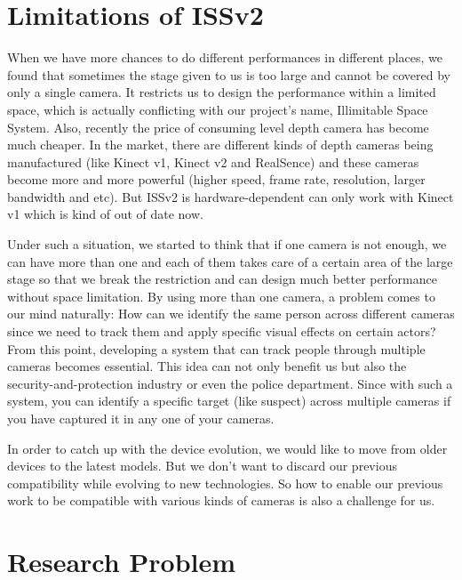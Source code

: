 \section{Limitations of ISSv2}
\label{sec:intro-lim-issv2}

When we have more chances to do different performances in different places,
we found that sometimes the stage given to us is too large and cannot be covered
by only a single camera. It restricts us to design the performance within a
limited space, which is actually conflicting with our project's name, Illimitable Space
System.
Also, recently the price of consuming level depth camera has become
much cheaper. In the market, there are different kinds of depth cameras
being manufactured (like Kinect v1, Kinect v2 and RealSence) and these cameras
become more and more powerful (higher speed, frame rate, resolution, larger
bandwidth and etc). But ISSv2 is hardware-dependent can only work with Kinect
v1 which is kind of out of date now.

Under such a situation, we started to think that if one camera is
not enough, we can have more than one and each of them takes care of a certain
area of the large stage so that we break the restriction and can design much
better performance without space limitation.
By using more than one camera, a problem comes to our mind naturally: How can
we identify the same person across different cameras since we need to track them
and apply specific visual effects on certain actors?
From this point, developing a system that can track people through multiple
cameras becomes essential.
This idea can not only benefit us but also the security-and-protection industry
or even the police department. Since with such a system, you can identify a
specific target (like suspect) across multiple cameras if you have captured it
in any one of your cameras.

In order to catch up with the device evolution, we would like to move from 
older devices to the latest models. But we don't want to discard our previous 
compatibility while evolving to new technologies. So how to enable our previous work to be 
compatible with various kinds of cameras is also a challenge for us.

\section{Research Problem}
\label{sec:intro-pbstat}

